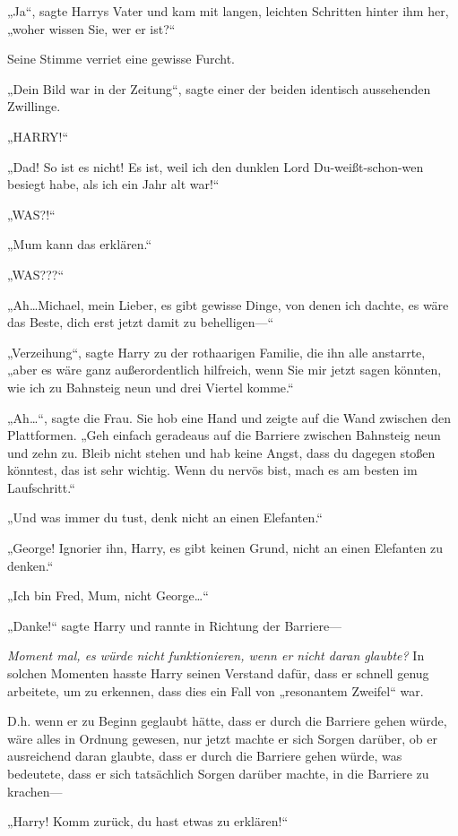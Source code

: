 {„Ja“, sagte Harrys Vater und kam mit langen, leichten Schritten hinter ihm her, „woher wissen Sie, wer er ist?“

Seine Stimme verriet eine gewisse Furcht.

„Dein Bild war in der Zeitung“, sagte einer der beiden identisch aussehenden Zwillinge.

„HARRY!“

„Dad! So ist es nicht! Es ist, weil ich den dunklen Lord Du-weißt-schon-wen besiegt habe, als ich ein Jahr alt war!“

„WAS?!“

„Mum kann das erklären.“

„WAS???“

„Ah…Michael, mein Lieber, es gibt gewisse Dinge, von denen ich dachte, es wäre das Beste, dich erst jetzt damit zu behelligen—“

„Verzeihung“, sagte Harry zu der rothaarigen Familie, die ihn alle anstarrte, „aber es wäre ganz außerordentlich hilfreich, wenn Sie mir jetzt sagen könnten, wie ich zu Bahnsteig neun und drei Viertel komme.“

„Ah…“, sagte die Frau. Sie hob eine Hand und zeigte auf die Wand zwischen den Plattformen. „Geh einfach geradeaus auf die Barriere zwischen Bahnsteig neun und zehn zu. Bleib nicht stehen und hab keine Angst, dass du dagegen stoßen könntest, das ist sehr wichtig. Wenn du nervös bist, mach es am besten im Laufschritt.“

„Und was immer du tust, denk nicht an einen Elefanten.“

„George! Ignorier ihn, Harry, es gibt keinen Grund, nicht an einen Elefanten zu denken.“

„Ich bin Fred, Mum, nicht George…“

„Danke!“ sagte Harry und rannte in Richtung der Barriere—

\emph{Moment mal, es würde nicht funktionieren, wenn er nicht daran glaubte?} In solchen Momenten hasste Harry seinen Verstand dafür, dass er schnell genug arbeitete, um zu erkennen, dass dies ein Fall von „resonantem Zweifel“ war.

D.h. wenn er zu Beginn geglaubt hätte, dass er durch die Barriere gehen würde, wäre alles in Ordnung gewesen, nur jetzt machte er sich Sorgen darüber, ob er ausreichend daran glaubte, dass er durch die Barriere gehen würde, was bedeutete, dass er sich tatsächlich Sorgen darüber machte, in die Barriere zu krachen—

„Harry! Komm zurück, du hast etwas zu erklären!“

}
